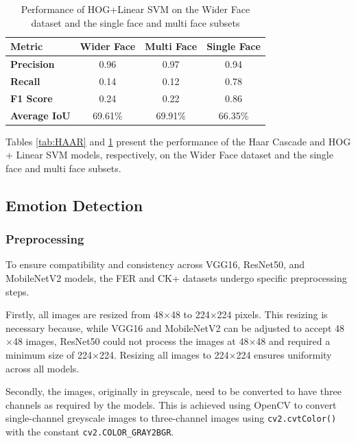 \begin{table}[h!]
\centering{}
\caption{Performance of HOG+Linear SVM on the Wider Face dataset and the single face and multi face subsets}
\begin{tabular}{|l|c|c|c|}
\hline
\textbf{Metric}      & \textbf{Wider Face} & \textbf{Multi Face}  & \textbf{Single Face} \\ \hline
\textbf{Precision}   & 0.96       & 0.97           & 0.94               \\ \hline
\textbf{Recall}      & 0.14       & 0.12           & 0.78               \\ \hline
\textbf{F1 Score}    & 0.24       & 0.22           & 0.86               \\ \hline
\textbf{Average IoU} & 69.61\%    & 69.91\%      & 66.35\%              \\ \hline
\end{tabular}
\label{tab:HOGSVM}
\end{table}

Tables \ref{tab:HAAR} and \ref{tab:HOGSVM} present the performance of the Haar Cascade and HOG + Linear SVM models, respectively, on the Wider Face dataset and the single face and multi face subsets.

\subsection{Emotion Detection}

\subsubsection{Preprocessing}

To ensure compatibility and consistency across VGG16, ResNet50, and MobileNetV2 models, the FER and CK+ datasets undergo specific preprocessing steps.

Firstly, all images are resized from 48\(\times\)48 to 224\(\times\)224 pixels. This resizing is necessary because, while VGG16 and MobileNetV2 can be adjusted to accept 48\(\times\)48 images, ResNet50 could not process the images at 48\(\times\)48 and required a minimum size of 224\(\times\)224. Resizing all images to 224\(\times\)224 ensures uniformity across all models.

Secondly, the images, originally in greyscale, need to be converted to have three channels as required by the models. This is achieved using OpenCV to convert single-channel greyscale images to three-channel images using \texttt{cv2.cvtColor()} with the constant \texttt{cv2.COLOR\_GRAY2BGR}.

